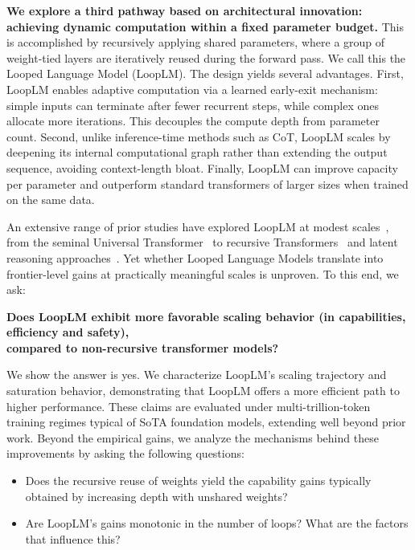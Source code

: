 \documentclass[]{bytedance_seed}
\newcommand{\1}{\mathbf{1}}
\newcommand{\ut}{LoopLM}
\begin{document}
\textbf{We explore a third pathway based on architectural innovation: achieving dynamic computation within a fixed parameter budget.} This is accomplished by recursively applying shared parameters, where a group of weight-tied layers are iteratively reused during the forward pass. We call this the Looped Language Model (\ut{}). The design yields several advantages. First, \ut{} enables adaptive computation via a learned early-exit mechanism: simple inputs can terminate after fewer recurrent steps, while complex ones allocate more iterations. This decouples the compute depth from parameter count. Second, unlike inference-time methods such as CoT, \ut{} scales by deepening its internal computational graph rather than extending the output sequence, avoiding context-length bloat. Finally, \ut{} can improve capacity per parameter and outperform standard transformers of larger sizes when trained on the same data. 

An extensive range of prior studies have explored \ut{} at modest scales~\cite{saunshi2025reasoning,gatmiry2024can,gatmiry2024role, huang2025transformers, merrill2025little, merrill2025exact,giannou2023looped,yang2023looped}, from the seminal Universal Transformer~\cite{dehghani2018universal} to recursive Transformers~\cite{bae2024relaxed} and latent reasoning approaches~\cite{geiping2025scaling,zeng2025pretraining,zhu2025survey}. Yet whether Looped Language Models translate into frontier-level gains at practically meaningful scales is unproven. To this end, we ask: 

\begin{center}
    \textbf{Does \ut{} exhibit more favorable scaling behavior (in capabilities, efficiency and safety),\\ compared to non-recursive transformer models?}
\end{center}

We show the answer is yes. We characterize \ut{}'s {} scaling trajectory and saturation behavior, demonstrating that \ut{} offers a more efficient path to higher performance. These claims are evaluated under multi-trillion-token training regimes typical of SoTA foundation models, extending well beyond prior work. Beyond the empirical gains, we analyze the mechanisms behind these improvements by asking the following questions:
\begin{itemize}
    \item[1.] Does the recursive reuse of weights yield the capability gains typically obtained by increasing depth with unshared weights?
    \item[2.] Are \ut{}'s gains monotonic in the number of loops? What are the factors that influence this?
\end{itemize}
\end{document}
